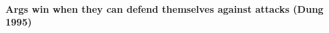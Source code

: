 \documentclass[10pt]{article}
\begin{document}


\paragraph{Args win when they can defend themselves against attacks (Dung 1995)}
\end{document}
